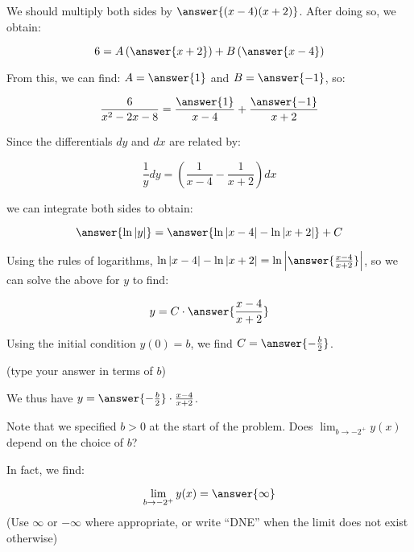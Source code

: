 \documentclass{ximera}
\begin{document}
\begin{exercise}
\begin{exercise}
\begin{hint}
\begin{question}
We should multiply both sides by $\answer{(x-4)(x+2)}$.  After doing so, we obtain:

\[
6=A\left(\answer{x+2}\right)+B\left(\answer{x-4}\right)
\]

From this, we can find: $A=\answer{1}$ and $B=\answer{-1}$, so:

\[
\frac{6}{x^2-2x-8} = \frac{\answer{1}}{x-4}+\frac{\answer{-1}}{x+2}
\]


\begin{question}
Since the differentials $dy$ and $dx$ are related by:

\[
\frac{1}{y}  dy = \left(\frac{1}{x-4}-\frac{1}{x+2} \right) dx
\]

we can integrate both sides to obtain:

\[
\answer{\ln|y|} = \answer{\ln|x-4| - \ln|x+2|} +C\\
\]

Using the rules of logarithms, $ \ln|x-4| - \ln|x+2| =  \ln\left| \answer{\frac{x-4}{x+2}} \right|$, so we can solve the above for $y$ to find:

\[
y= C \cdot \answer{\frac{x-4}{x+2}} \\
\]
  
\begin{question}  
Using the initial condition $y(0)=b$, we find $C=\answer{-\frac{b}{2}}$.

(type your answer in terms of $b$)

We thus have $y = \answer{-\frac{b}{2}} \cdot \frac{x-4}{x+2}$.


\end{question}
\end{question}
\end{question}
 \end{hint}
 
\begin{exercise}
Note that we specified $b>0$ at the start of the problem.  Does $\lim_{b \to -2^+} y(x)$ depend on the choice of $b$?
\begin{multipleChoice}
\end{multipleChoice}
In fact, we find:

\[
\lim_{b \to -2^+} y(x) = \answer{\infty}
\]
(Use $\infty$ or $-\infty$ where appropriate, or write ``DNE'' when the limit does not exist otherwise)
\end{exercise}
 \end{exercise}
\end{exercise}
\end{document}
